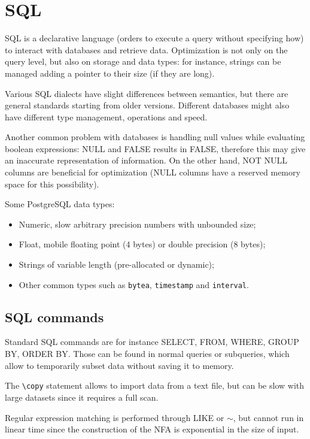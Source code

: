 \section{SQL}
SQL is a declarative language (orders to execute a query without specifying how) to interact with databases and retrieve data. Optimization is not only on the query level, but also on storage and data types: for instance, strings can be managed adding a pointer to their size (if they are long). 

Various SQL dialects have slight differences between semantics, but there are general standards starting from older versions. Different databases might also have different type management, operations and speed.

Another common problem with databases is handling null values while evaluating boolean expressions: NULL and FALSE results in FALSE, therefore this may give an inaccurate representation of information. On the other hand, NOT NULL columns are beneficial for optimization (NULL columns have a reserved memory space for this possibility).

Some PostgreSQL data types:
\begin{itemize}
	\item Numeric, slow arbitrary precision numbers with unbounded size;
	\item Float, mobile floating point (4 bytes) or double precision (8 bytes);
	\item Strings of variable length (pre-allocated or dynamic);
	\item Other common types such as \texttt{bytea}, \texttt{timestamp} and \texttt{interval}.
\end{itemize} 

\subsection{SQL commands}
Standard SQL commands are for instance SELECT, FROM, WHERE, GROUP BY, ORDER BY. Those can be found in normal queries or subqueries, which allow to temporarily subset data without saving it to memory.

The \texttt{\textbackslash copy} statement allows to import data from a text file, but can be slow with large datasets since it requires a full scan.

Regular expression matching is performed through LIKE or $\sim$, but cannot run in linear time since the construction of the NFA is exponential in the size of input. 

